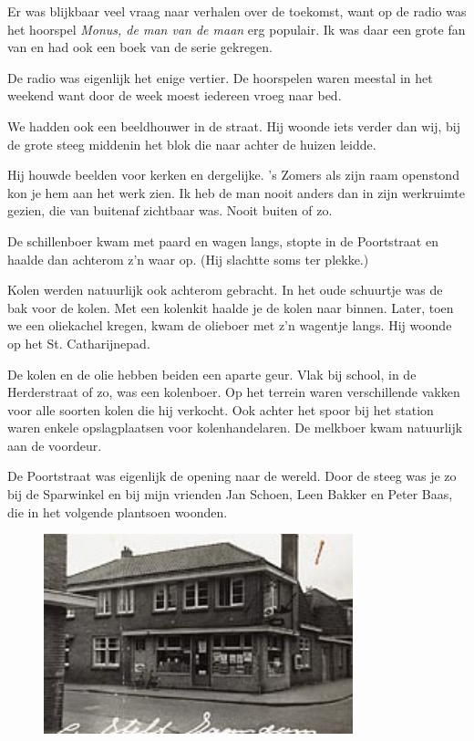 \documentclass[12pt,twoside, openright]{memoir}
\begin{document}
Er was blijkbaar veel vraag naar verhalen over de toekomst, want op de radio was het hoorspel \emph{Monus, de man van de maan} erg populair. Ik was daar een grote fan van en had ook een boek van de serie gekregen.

De radio was eigenlijk het enige vertier. De hoorspelen waren meestal in het weekend want door de week moest iedereen vroeg naar bed.

We hadden ook een beeldhouwer in de straat. Hij woonde iets verder dan wij, bij de grote steeg middenin het blok die naar achter de huizen leidde.  

Hij houwde beelden voor kerken en dergelijke. 's Zomers als zijn raam openstond kon je hem aan het werk zien. Ik heb de man nooit anders dan in zijn werkruimte gezien, die van buitenaf zichtbaar was. Nooit buiten of zo.

De schillenboer kwam met paard en wagen langs, stopte in de Poortstraat en haalde dan achterom z’n waar op. (Hij slachtte soms ter plekke.) 

Kolen werden natuurlijk ook achterom gebracht. In het oude schuurtje was de bak voor de kolen. Met een kolenkit haalde je de kolen naar binnen. Later, toen we een oliekachel kregen, kwam de olieboer met z’n wagentje langs. Hij woonde op het St. Catharijnepad.

De kolen en de olie hebben beiden een aparte geur. Vlak bij school, in de Herderstraat of zo, was een kolenboer. Op het terrein waren verschillende vakken voor alle soorten kolen die hij verkocht. Ook achter het spoor bij het station waren enkele opslagplaatsen voor kolenhandelaren. De melkboer kwam natuurlijk aan de voordeur.

De Poortstraat was eigenlijk de opening naar de wereld. Door de steeg was je zo bij de Sparwinkel en bij mijn vrienden Jan Schoen, Leen Bakker en Peter Baas, die in het volgende plantsoen woonden. 

\begin{figure}
\centering
\includegraphics[width=0.8\textwidth]{img/ch5/Spar-Poortstr}
\end{figure}
\end{document}
